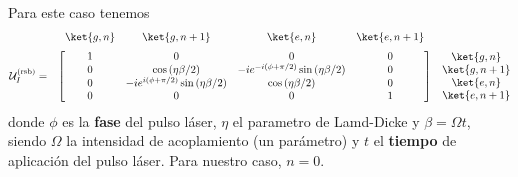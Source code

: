 \documentclass[a4paper,11pt]{article} %
\def\lp{\left(}
\def\rp{\right)}
\begin{document}
Para este caso tenemos 
\begin{equation*} \label{ec_ions_U_rsb}
 \begin{matrix}
    & 
    \begin{matrix}
      \ket{g,n}  & 
      \makebox[\widthof{$-i e^{i (\phi+ \pi/2)} \sin \lp \eta\beta/2 \rp$}]{$\ket{g,n+1}$}  & 
      \makebox[\widthof{$-i e^{-i (\phi+ \pi/2)} \sin \lp \eta\beta/2 \rp$}]{$\ket{e,n}$}   &
      \ket{e,n+1}
    \end{matrix} 	&  \\[.5\normalbaselineskip]
    \mathcal{U}_I^{(\text{rsb})} = & 
    \begin{bmatrix}
        \makebox[\widthof{$\ket{g,n}$}]{$1$}  & 
        0 & 
        0 & 
        \makebox[\widthof{$\ket{e,n+1}$}]{$0$} \\
        \makebox[\widthof{$\ket{g,n}$}]{$0$}   & 
        \cos \lp \eta\beta/2 \rp    & 
        -i e^{-i (\phi+ \pi/2)} \sin \lp \eta\beta/2 \rp & 
        \makebox[\widthof{$\ket{e,n+1}$}]{$0$} \\
        \makebox[\widthof{$\ket{g,n}$}]{$0$} & 
        -i e^{i (\phi+ \pi/2)} \sin \lp \eta\beta/2 \rp   & 
        \cos \lp \eta\beta/2 \rp & 
        \makebox[\widthof{$\ket{e,n+1}$}]{$0$} \\
        \makebox[\widthof{$\ket{g,n}$}]{$0$} & 
        0 & 
        0 & 
        \makebox[\widthof{$\ket{e,n+1}$}]{$1$} 
    \end{bmatrix} &
    \begin{matrix} \ket{g,n} \\ \ket{g,n+1} \\ \ket{e,n} \\ \ket{e,n+1} \end{matrix} 
\end{matrix}
\end{equation*}
donde $\phi$ es la \textbf{fase} del pulso láser, $\eta$ el parametro de Lamd-Dicke y $\beta = \Omega t$, siendo $\Omega$ la intensidad de acoplamiento (un parámetro) y $t$ el \textbf{tiempo} de aplicación del pulso láser. Para nuestro caso, $n = 0$. 
\end{document}
